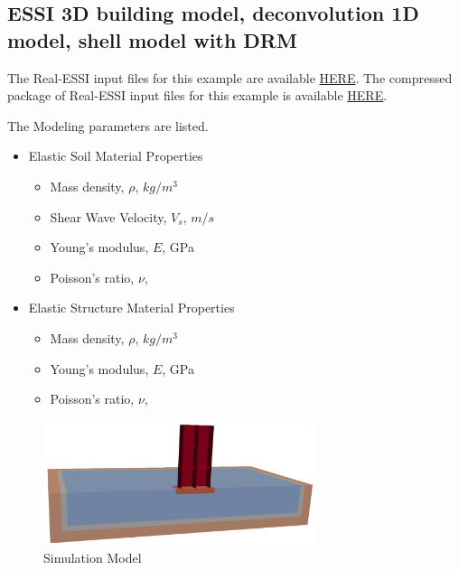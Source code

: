 \subsection{ESSI 3D building model, deconvolution 1D model, shell model with DRM}
\label{Earthquake_Soil-Structure_Interaction_3D_Model_with_DRM2}

The Real-ESSI input files for this example are available 
\href{http://sokocalo.engr.ucdavis.edu/~jeremic/lecture_notes_online_material/_Chapter_Short_Course_Examples/Day2/Deconvolution_1D_Motions/Shell_Structure_Soil_Interaction_3D_DRM}{HERE}. 
The compressed package of Real-ESSI input files for this example is available 
\href{http://sokocalo.engr.ucdavis.edu/~jeremic/lecture_notes_online_material/_Chapter_Short_Course_Examples/Day2/Deconvolution_1D_Motions/Shell_Structure_Soil_Interaction_3D_DRM/_all_files_packaged_for_Shell_Structure_Soil_Interaction_3D_DRM.tar.gz}{HERE}. 

The Modeling parameters are listed.
\begin{itemize}
  \item Elastic Soil Material Properties 
  \begin{itemize}
    \item Mass density, $\rho$, \enspace {} $kg/m^3$
    \item Shear Wave Velocity, $V_s$, \enspace {} $m/s$
    \item Young's modulus, $E$, \enspace {} GPa
    \item Poisson's ratio, $\nu$, \enspace {}
  \end{itemize}
  \item Elastic Structure Material Properties 
  \begin{itemize}
    \item Mass density, $\rho$, \enspace {} $kg/m^3$
    \item Young's modulus, $E$, \enspace {} GPa
    \item Poisson's ratio, $\nu$, \enspace {}
  \end{itemize}
\end{itemize}

\begin{figure}[H]
  \centering
  \includegraphics[width = 8cm]{./Figure-files/Day2/Deconvolution_1D_Motions/Shell_Structure_Soil_Interaction_3D_DRM/overview.png}
  \caption{Simulation Model}
  \label{fig_decon_1D_motion_3D_model_shell1}
\end{figure}


